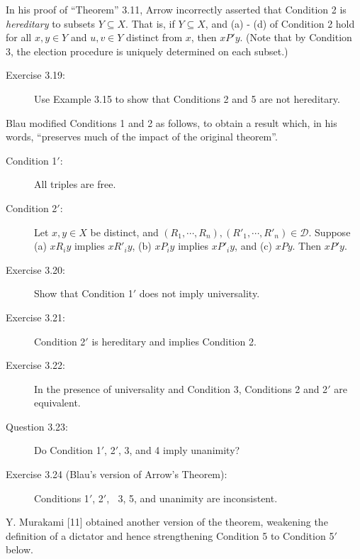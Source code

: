 \documentclass{article}
\begin{document}
In his proof of ``Theorem'' 3.11, Arrow incorrectly asserted that Condition 2 is \emph{hereditary} to subsets $Y \subseteq X$. That is, if $Y \subseteq X$, and (a) - (d) of Condition 2 hold for all $x,y \in Y$ and $u,v \in Y$ distinct from $x$, then $xP'y$. (Note that by Condition 3, the election procedure is uniquely determined on each subset.)

\begin{description}

\item[Exercise 3.19:] Use Example 3.15 to show that Conditions 2 and 5 are not hereditary.

\end{description}

Blau modified Conditions 1 and 2 as follows, to obtain a result which, in his words, ``preserves much of the impact of the original theorem''.

\begin{description}

\item[Condition 1$'$:] All triples are free.

\item[Condition 2$'$:] Let $x,y \in X$ be distinct, and $(R_{1},\cdots,R_{n}), (R'_{1},\cdots,R'_{n}) \in \mathcal{D}$. Suppose (a) $xR_{i}y$ implies $xR'_{i}y$, (b) $xP_{i}y$ implies $xP'_{i}y$, and (c) $xPy$. Then $xP'y$.

\item[Exercise 3.20:] Show that Condition 1$'$ does not imply universality.

\item[Exercise 3.21:] Condition 2$'$ is hereditary and implies Condition 2.

\item[Exercise 3.22:] In the presence of universality and Condition 3, Conditions 2 and 2$'$ are equivalent.

\item[Question 3.23:] Do Condition 1$'$, 2$'$, 3, and 4 imply unanimity?

\item[Exercise 3.24 (Blau's version of Arrow's Theorem):] Conditions 1$'$, 2$'$, $\ $ 3, 5, and unanimity are inconsistent.

\end{description}

Y. Murakami [11] obtained another version of the theorem, weakening the definition of a dictator and hence strengthening Condition 5 to Condition 5$'$ below.
\end{document}
